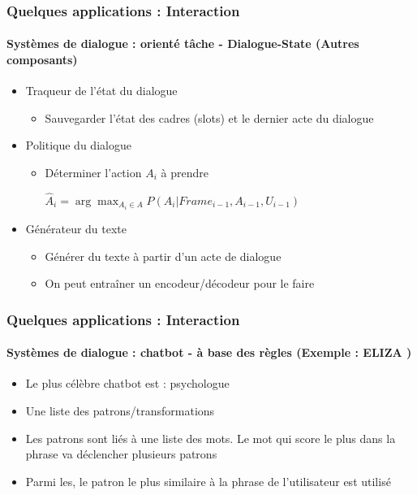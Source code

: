 \documentclass[xcolor=table]{beamer}
\begin{document}
\begin{frame}
	\frametitle{Quelques applications : Interaction}
	\framesubtitle{Systèmes de dialogue : orienté tâche - Dialogue-State (Autres composants)}
	
	\begin{itemize}
		\item Traqueur de l'état du dialogue
		\begin{itemize}
			\item Sauvegarder l'état des cadres (slots) et le dernier acte du dialogue
		\end{itemize}
		\item Politique du dialogue
		\begin{itemize}
			\item Déterminer l'action $A_i$ à prendre 
			
			$\hat{A}_i = \arg\max_{A_i \in A} P(A_i | Frame_{i-1}, A_{i-1}, U_{i-1})$
		\end{itemize}
	
		\item Générateur du texte 
		\begin{itemize}
			\item Générer du texte à partir d'un acte de dialogue
			\item On peut entraîner un encodeur/décodeur pour le faire
		\end{itemize}
	\end{itemize}
	
\end{frame}

\begin{frame}
	\frametitle{Quelques applications : Interaction}
	\framesubtitle{Systèmes de dialogue : chatbot - à base des règles (Exemple : ELIZA \cite{1966-Weizenbaum})}
	
	\begin{itemize}
		\item Le plus célèbre chatbot est  : psychologue
		\item Une liste des patrons/transformations 
		
		
		
		\item Les patrons sont liés à une liste des mots. Le mot qui score le plus dans la phrase va déclencher plusieurs patrons
		
		\item Parmi les, le patron le plus similaire à la phrase de l'utilisateur est utilisé
	\end{itemize}
	
\end{frame}
\end{document}
